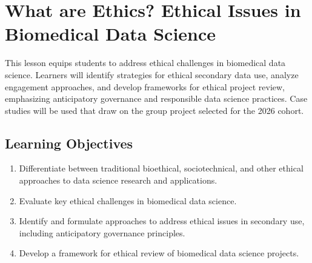 

\section{What are Ethics? Ethical Issues in Biomedical Data Science}
\label{sec:1.2}

This lesson equips students to address ethical challenges in biomedical data science. Learners will identify strategies for ethical secondary data use, analyze engagement approaches, and develop frameworks for ethical project review, emphasizing anticipatory governance and responsible data science practices. Case studies will be used that draw on the group project selected for the 2026 cohort.

\subsection{Learning Objectives}

\begin{enumerate}
    \item Differentiate between traditional bioethical, sociotechnical, and other ethical approaches to data science research and applications.
    \item Evaluate key ethical challenges in biomedical data science.
    \item Identify and formulate approaches to address ethical issues in secondary use, including anticipatory governance principles.
    \item Develop a framework for ethical review of biomedical data science projects.
\end{enumerate}

